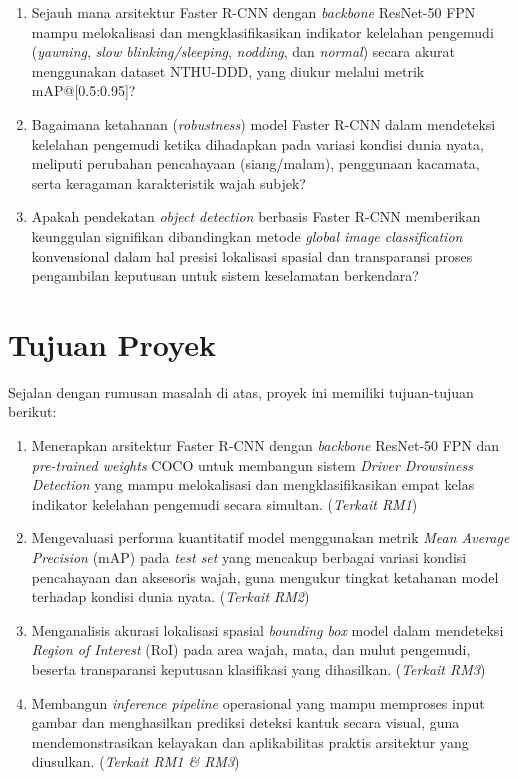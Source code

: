 \documentclass[11pt,a4paper,oneside]{report}
\begin{document}
\begin{enumerate}[label=RM\arabic*.,leftmargin=*]
    \item {Sejauh mana arsitektur Faster R-CNN dengan \textit{backbone} ResNet-50 FPN mampu melokalisasi dan mengklasifikasikan indikator kelelahan pengemudi (\textit{yawning}, \textit{slow blinking/sleeping}, \textit{nodding}, dan \textit{normal}) secara akurat menggunakan dataset NTHU-DDD, yang diukur melalui metrik mAP@[0.5:0.95]?}
    \item {Bagaimana ketahanan (\textit{robustness}) model Faster R-CNN dalam mendeteksi kelelahan pengemudi ketika dihadapkan pada variasi kondisi dunia nyata, meliputi perubahan pencahayaan (siang/malam), penggunaan kacamata, serta keragaman karakteristik wajah subjek?}
    \item {Apakah pendekatan \textit{object detection} berbasis Faster R-CNN memberikan keunggulan signifikan dibandingkan metode \textit{global image classification} konvensional dalam hal presisi lokalisasi spasial dan transparansi proses pengambilan keputusan untuk sistem keselamatan berkendara?}
\end{enumerate}

\section{Tujuan Proyek}

Sejalan dengan rumusan masalah di atas, proyek ini memiliki tujuan-tujuan berikut:

\begin{enumerate}[label=T\arabic*.,leftmargin=*]
    \item {Menerapkan arsitektur Faster R-CNN dengan \textit{backbone} ResNet-50 FPN dan \textit{pre-trained weights} COCO untuk membangun sistem \textit{Driver Drowsiness Detection} yang mampu melokalisasi dan mengklasifikasikan empat kelas indikator kelelahan pengemudi secara simultan. (\textit{Terkait RM1})}
    \item {Mengevaluasi performa kuantitatif model menggunakan metrik \textit{Mean Average Precision} (mAP) pada \textit{test set} yang mencakup berbagai variasi kondisi pencahayaan dan aksesoris wajah, guna mengukur tingkat ketahanan model terhadap kondisi dunia nyata. (\textit{Terkait RM2})}
    \item {Menganalisis akurasi lokalisasi spasial \textit{bounding box} model dalam mendeteksi \textit{Region of Interest} (RoI) pada area wajah, mata, dan mulut pengemudi, beserta transparansi keputusan klasifikasi yang dihasilkan. (\textit{Terkait RM3})}
    \item {Membangun \textit{inference pipeline} operasional yang mampu memproses input gambar dan menghasilkan prediksi deteksi kantuk secara visual, guna mendemonstrasikan kelayakan dan aplikabilitas praktis arsitektur yang diusulkan. (\textit{Terkait RM1 \& RM3})}
\end{enumerate}
\end{document}
